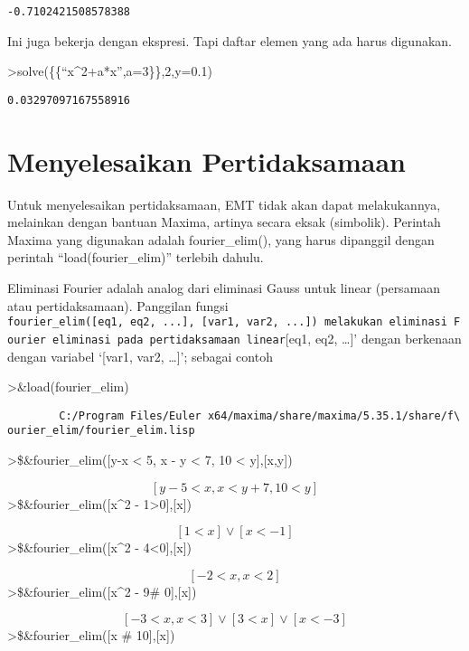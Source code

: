 \documentclass[
]{book}
\begin{document}
\begin{verbatim}
-0.7102421508578388
\end{verbatim}

Ini juga bekerja dengan ekspresi. Tapi daftar elemen yang ada harus digunakan.

\textgreater solve(\{\{``x\^{}2+a*x'',a=3\}\},2,y=0.1)

\begin{verbatim}
0.03297097167558916
\end{verbatim}

\section{Menyelesaikan Pertidaksamaan}\label{menyelesaikan-pertidaksamaan}

Untuk menyelesaikan pertidaksamaan, EMT tidak akan dapat melakukannya, melainkan dengan bantuan Maxima, artinya secara eksak (simbolik). Perintah Maxima yang digunakan adalah fourier\_elim(), yang harus dipanggil dengan perintah ``load(fourier\_elim)'' terlebih dahulu.

Eliminasi Fourier adalah analog dari eliminasi Gauss untuk linear (persamaan atau pertidaksamaan). Panggilan fungsi \texttt{fourier\_elim({[}eq1,\ eq2,\ ...{]},\ {[}var1,\ var2,\ ...{]})\textquotesingle{}\ melakukan\ eliminasi\ Fourier\ eliminasi\ pada\ pertidaksamaan\ linear}{[}eq1, eq2, \ldots{]}' dengan berkenaan dengan variabel `{[}var1, var2, \ldots{]}'; sebagai contoh

\textgreater\&load(fourier\_elim)

\begin{verbatim}
        C:/Program Files/Euler x64/maxima/share/maxima/5.35.1/share/f\
ourier_elim/fourier_elim.lisp
\end{verbatim}

\textgreater\$\&fourier\_elim({[}y-x \textless{} 5, x - y \textless{} 7, 10 \textless{} y{]},{[}x,y{]})

\[\left[ y-5<x , x<y+7 , 10<y \right] \]\textgreater\$\&fourier\_elim({[}x\^{}2 - 1\textgreater0{]},{[}x{]})

\[\left[ 1<x \right] \lor \left[ x<-1 \right] \]\textgreater\$\&fourier\_elim({[}x\^{}2 - 4\textless0{]},{[}x{]})

\[\left[ -2<x , x<2 \right] \]\textgreater\$\&fourier\_elim({[}x\^{}2 - 9\# 0{]},{[}x{]})

\[\left[ -3<x , x<3 \right] \lor \left[ 3<x \right] \lor \left[ x<-3
  \right] \]\textgreater\$\&fourier\_elim({[}x \# 10{]},{[}x{]})
\end{document}

